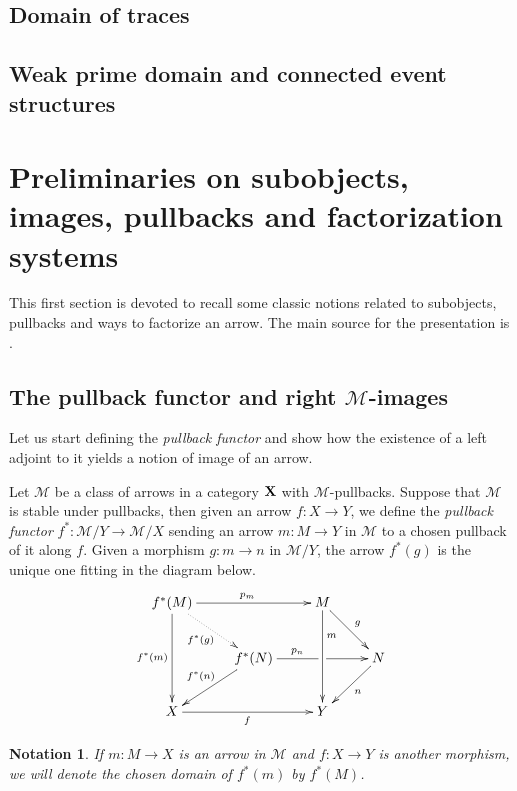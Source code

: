 \documentclass[a4paper,UKenglish,cleveref,pdftex,thm-restate,numberwithinsect]{lipics-v2021}
\def\X{\textbf {\textup{X}}}
\newtheorem*{notation}{Notation}
\begin{document}
\subsection{Domain of traces}
\subsection{Weak prime domain and connected event structures}






\appendix

\section{Preliminaries on subobjects, images, pullbacks and factorization systems}\label{app:fact}


This first section is devoted to recall some classic notions related to subobjects, pullbacks and ways to factorize an arrow. The main source for the presentation is \cite[Ch.~1]{dikranjan2013categorical}.
\subsection{The pullback functor and right $\mathcal{M}$-images}

Let us start defining the \emph{pullback functor} and show how the existence of a left adjoint to it yields a notion of image of an arrow.

\begin{definition}
	Let $\mathcal{M}$ be a class of arrows in a category $\X$ with $\mathcal{M}$-pullbacks. Suppose that $\mathcal{M}$ is stable under pullbacks, then given an arrow $f\colon X\to Y$, we define the \emph{pullback functor} $f^*\colon \mathcal{M}/Y\to \mathcal{M}/X$ sending an arrow $m:M\to Y$ in $\mathcal{M}$ to a chosen pullback of it along $f$. Given a morphism $g:m\to n$ in $\mathcal{M}/Y$, the arrow $f^*(g)$ is the unique one fitting in the diagram below.
	\[\xymatrix{f^*(M)  \ar[dd]_{f^*(m)} \ar@{.>}[dr]_{f^*(g)}\ar[rr]^{p_m}&& M \ar[dr]^{g}\ar[dd]^(.3){m} \\&f^*(N)  \ar[rr]^(.35){p_n}|(.55)\hole \ar[dl]_{f^*(n)}&& N \ar[dl]^{n}\\ X \ar[rr]_{f}&& Y }\]
\end{definition}

\begin{notation}
	If $m\colon M\to X$ is an arrow in $\mathcal{M}$ and $f\colon X\to Y$ is another morphism, we will denote the chosen domain of $f^*(m)$ by $f^*(M)$.
\end{notation}
\end{document}
